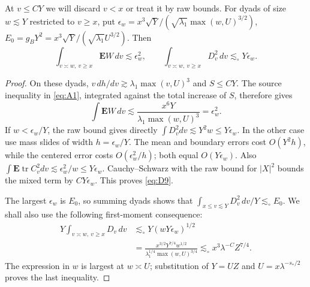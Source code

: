 \begin{lemma}\label{lem:statistics-lower-band}
At \(v\le C Y\) we will discard \(v<x\) or treat it by raw bounds. For dyads of size \(w\lesssim Y\) restricted to \(v\ge x\), put
\(\epsilon_w=x^3\sqrt Y/(\sqrt{\lambda_1}\max(w,U)^{3/2})\), \(E_0=g_B Y^2=x^3\sqrt Y/(\sqrt{\lambda_1}U^{3/2})\). Then
\begin{equation}
\int_{v\asymp w,\ v\ge x}\mathbf EW\,dv\lesssim\epsilon_w^2,\qquad
 \int_{v\asymp w,\ v\ge x} D_v^2\,dv\lesssim_\circ Y\epsilon_w.           \tag{D9}\label{eq:D9}
\end{equation}
\end{lemma}
\begin{proof}
On these dyads,
$v\,dh/dv\gtrsim\lambda_1\max(v,U)^3$ and $S\le CY$.
The source inequality in \eqref{eq:A1}, integrated against the total
increase of $S$, therefore gives
\[
 \int\mathbf EW\,dv
 \lesssim \frac{x^6Y}{\lambda_1\max(w,U)^3}=\epsilon_w^2.
\]
If $w<\epsilon_w/Y$, the raw bound gives directly
$\int D_v^2dv\lesssim Y^2w\le Y\epsilon_w$.  In the other case use
mass slides of width $h=\epsilon_w/Y$.  The mean and boundary errors
cost $O(Y^2h)$, while the centered error costs $O(\epsilon_w^2/h)$;
both equal $O(Y\epsilon_w)$.  Also
$\int\mathbf E\operatorname{tr}C_v^2dv\lesssim\epsilon_w^2/w
\le Y\epsilon_w$.
Cauchy--Schwarz with the raw bound for $|X|^2$ bounds the mixed term
by $CY\epsilon_w$.  This proves \eqref{eq:D9}.

The largest $\epsilon_w$ is $E_0$, so summing dyads shows that
$\int_{x\le v\lesssim Y}D_v^2\,dv/Y\lesssim_\circ E_0$.
We shall also use the following first-moment consequence:
\begin{align*}
 Y\int_{v\asymp w,\ v\ge x}D_v\,dv
 &\lesssim_\circ Y(wY\epsilon_w)^{1/2}\\
 &=\frac{x^{3/2}Y^{7/4}w^{1/2}}
         {\lambda_1^{1/4}\max(w,U)^{3/4}}
 \lesssim_\circ x^3\lambda^{-C}Z^{7/4}.
\end{align*}
The expression in $w$ is largest at $w\asymp U$; substitution of
$Y=UZ$ and $U=x\lambda^{-s_*/2}$ proves the last inequality.

\end{proof}

